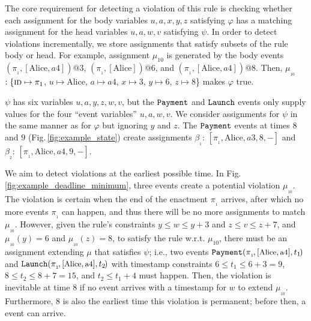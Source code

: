 The core requirement for detecting a violation
of this rule is
checking whether each
assignment for the body variables $u,a,x,y,z$
satisfying $\varphi$
has a matching assignment
for the head variables $u,a,w,v$ satisfying $\psi$.
In order to detect violations incrementally,
we store assignments
that satisfy subsets of the rule body or head.
For example, assignment $\mu_{10}\!$
is generated by
the body events 
\Request$(\pi_{_1},[\mbox{Alice}, a4])@3$,
\Approval$(\pi_{_1},[\mbox{Alice}])@6$,
and
\Reserve$(\pi_{_1},[\mbox{Alice}, a4])@8$.
Then,
$\mu_{_{10}}\!$
$:\{\textsc{id}\mapsto\pi_{1}$,
$u\mapsto \mbox{Alice}$,
$a\mapsto a4$,
$x\mapsto 3$,
$y\mapsto 6$,
$z\mapsto 8$\}
makes $\varphi$ true.

$\psi$ has six variables $u,a,y,z,w,v$,
but
the $\texttt{Payment}$ and $\texttt{Launch}$ events
only supply values for
the four ``event variables'' $u,a,w,v$.
We consider assignments for $\psi$
in the same manner as for $\varphi$ but ignoring $y$ and $z$.
The $\texttt{Payment}$ events at times $8$ and $9$
(Fig.\,\ref{fig:example_state})
create assignments
$\beta_{_1\!}{:}\,[\pi_{_1},\mbox{Alice}, a3, \allowbreak 8, -]$ and 
$\beta_{_2\!}{:}\,[\pi_{_1},\mbox{Alice}, a4, 9, -]$.

We aim to detect violations
at the earliest possible time.
In Fig.\,\ref{fig:example_deadline_minimum},
three events
create a potential violation $\mu_{_{10}}$.
The violation is certain when
the end of the enactment $\pi_{_1}$ arrives,
after which no more events $\pi_{_1}$ can happen,
and thus there will be no more assignments to match $\mu_{_{10}}$.
However,
given the rule's constraints 
$y{\le} w {\leq} y {+} 3$ and 
$z{\le} v {\leq} z {+} 7$,
and 
$\mu_{_{10}}(y){=}6$ 
and
$\mu_{_{10}}(z){=}8$,
to satisfy the rule w.r.t. $\mu_{10}$,
there must be an assignment extending $\mu$
that satisfies $\psi$;
i.e.,
two events
$\texttt{Payment}(\pi_{_1\!},[\mbox{\small Alice},\allowbreak\mbox{\small a4}], t_{1\!})$
and
$\texttt{Launch}(\pi_{_1\!},[\mbox{\small Alice},\mbox{\small a4}], t_{2\!})$
with timestamp constraints $6{\leq} t_1{\leq} 6{+}3{=}9$,
$8{\leq} t_2{\leq} 8{+}7{=}15$,
and
$t_2{\leq}t_1{+}4$
must happen.
Then,
the violation is inevitable at time $8$
if no {\Payment} event arrives with a timestamp for $w$
to extend $\mu_{_{10}}$.
Furthermore, $8$ is also the earliest time
this violation is permanent;
before then,
a {\Payment} event can arrive.

